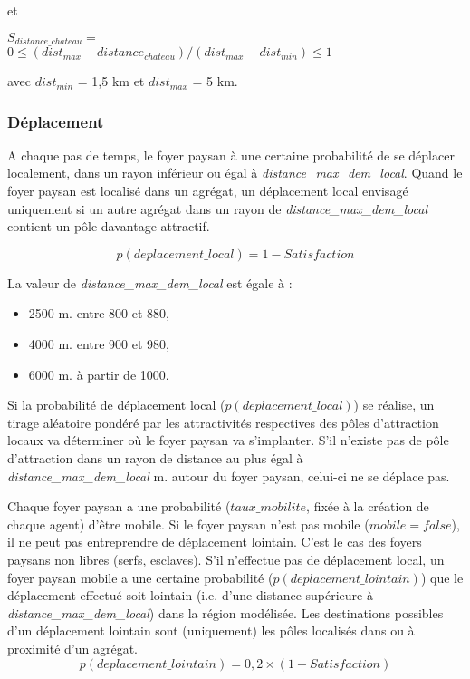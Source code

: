 \documentclass[a4paper,11pt]{article}
\begin{document}
{\begin{enumerate}
et

$S_{distance\_chateau} =$ \\
$0 ≤ (dist_{max} - distance_{chateau}) / (dist_{max} - dist_{min}) ≤ 1$

avec $dist_{min}$ = 1,5 km et $dist_{max}$ = 5 km.

\end{enumerate}


\subsubsection{Déplacement}
\begin{sloppypar}
A chaque pas de temps, le foyer paysan à une certaine probabilité de se déplacer localement, dans un rayon inférieur ou égal à \textit{distance\_max\_dem\_local}. Quand le foyer paysan est localisé dans un agrégat, un déplacement local envisagé uniquement si un autre agrégat dans un rayon de \textit{distance\_max\_dem\_local} contient un pôle davantage attractif.
\end{sloppypar}
\begin{equation}
p(deplacement\_local) = 1 - Satisfaction
\end{equation}

La valeur de \textit{distance\_max\_dem\_local} est égale à :
\begin{itemize}
\item 2500 m. entre 800 et 880,
\item 4000 m. entre 900 et 980,
\item 6000 m. à partir de 1000.
\end{itemize}
Si la probabilité de déplacement local ($p(deplacement\_local)$) se réalise, un tirage aléatoire pondéré par les attractivités respectives des pôles d'attraction locaux va déterminer où le foyer paysan va s'implanter. S'il n'existe pas de pôle d'attraction dans un rayon de distance au plus égal à\\ \textit{distance\_max\_dem\_local} m. autour du foyer paysan, celui-ci ne se déplace pas.

\bigskip
Chaque foyer paysan a une probabilité ($taux\_mobilite$, fixée à la création de chaque agent) d'être mobile. Si le foyer paysan n'est pas mobile ($ mobile = false $), il ne peut pas entreprendre de déplacement lointain. C'est le cas des foyers paysans non libres (serfs, esclaves). S'il n'effectue pas de déplacement local, un foyer paysan mobile a une certaine probabilité ($p(deplacement\_lointain)$) que le déplacement effectué soit lointain (i.e. d'une distance supérieure à \textit{distance\_max\_dem\_local}) dans la région modélisée. Les destinations possibles d'un déplacement lointain sont (uniquement) les pôles localisés dans ou à proximité d'un agrégat.
\begin{equation}
p(deplacement\_lointain) = 0,2 \times (1 - Satisfaction)
\end{equation}


}
\end{document}
